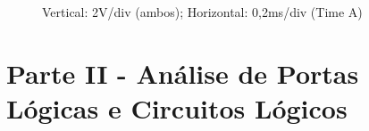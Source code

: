 \documentclass[pdftex,12pt,a4paper]{report}
\begin{document}
\begin{figure}[h]
\centerline{}
\caption{Vertical: 2V/div (ambos); Horizontal: 0,2ms/div (Time A)}\label{grafico_1c_osciloscopio}
\end{figure}

\newpage

\section{Parte II - Análise	de	Portas	Lógicas	e	Circuitos	Lógicos}
\end{document}
